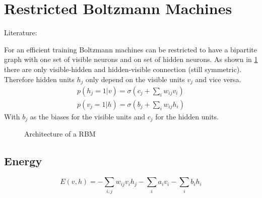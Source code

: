 \section{Restricted Boltzmann Machines}\label{sec:rbm}%
Literature: \cite{Bengio2009}

For an efficient training Boltzmann machines can be restricted to have a bipartite graph with one set of visible neurons and on set of hidden neurons.
As shown in \cref{fig:rbm} there are only visible-hidden and hidden-visible connection (still symmetric). Therefore hidden units $h_j$ only depend on the visible units $v_j$ and vice versa.
\begin{align}
p(h_j=1|v) = \sigma(c_j + \sum_i w_{ij} v_i)\\
p(v_j=1|h) = \sigma(b_j + \sum_i w_{ij} h_i)
\end{align}
With $b_j$ as the biases for the visible units and $c_j$ for the hidden units.

\begin{figure}
\centering
{}
\caption{Architecture of a \gls{RBM}}
\label{fig:rbm}
\end{figure}

\subsection{Energy}
\begin{equation}\label{eq:rbm-energy}
E(v,h) = - \sum_{i,j} w_{ij} v_i h_j - \sum_i a_i v_i - \sum_i b_i h_i
\end{equation}

